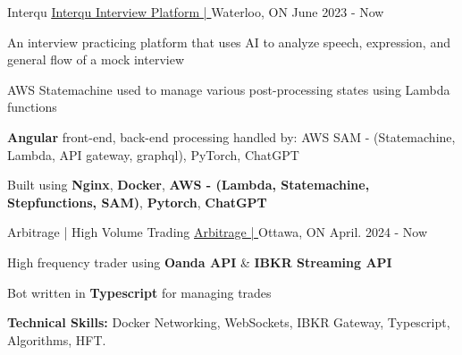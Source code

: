 \begin{cventries}
	\cventry
	{Interqu}  %
	{\underline{\href{https://github.com/Interqu}{Interqu Interview Platform | \ExternalLink}}} %
	{Waterloo, ON} %
	{June 2023 - Now} %
	{
		\begin{cvitems} %
			\item {An interview practicing platform that uses AI to analyze speech, expression, and general flow of a mock interview}
      \item {AWS Statemachine used to manage various post-processing states using Lambda functions}
			\item {\textbf{Angular} front-end, back-end processing handled by: AWS SAM - (Statemachine, Lambda, API gateway, graphql), PyTorch, ChatGPT}
			\item {Built using \textbf{Nginx}, \textbf{Docker}, \textbf{AWS - (Lambda, Statemachine, Stepfunctions, SAM)}, \textbf{Pytorch}, \textbf{ChatGPT}}
		\end{cvitems}
	}

	\cventry
	{Arbitrage | High Volume Trading}
	{\underline{\href{https://github.com/LefanHu/OARB}{Arbitrage | \ExternalLink}}} %
	{Ottawa, ON} %
	{April. 2024 - Now} %
	{
		\begin{cvitems} %
			\item {High frequency trader using \textbf{Oanda API} \& \textbf{IBKR Streaming API}}
			\item {Bot written in \textbf{Typescript} for managing trades}
			\item {\textbf{Technical Skills:} Docker Networking, WebSockets, IBKR Gateway, Typescript, Algorithms, HFT.}
		\end{cvitems}
	}







\end{cventries}
